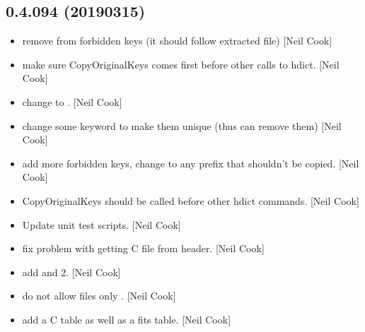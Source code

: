 \documentclass[a4paper,10pt,english]{report}
\begin{document}
\subsection{0.4.094 (2019\sphinxhyphen{}03\sphinxhyphen{}15)}
\label{\detokenize{misc/changelog:id184}}\begin{itemize}
\item {} 
 \sphinxhyphen{} remove  from forbidden keys (it should follow
extracted file) {[}Neil Cook{]}

\item {} 
 \sphinxhyphen{} make sure CopyOriginalKeys comes first before other
calls to hdict. {[}Neil Cook{]}

\item {} 
 \sphinxhyphen{} change  to .
{[}Neil Cook{]}

\item {} 
 \sphinxhyphen{} change some keyword to make them unique (thus can
remove them) {[}Neil Cook{]}

\item {} 
 \sphinxhyphen{} add more forbidden keys, change  to any prefix
that shouldn’t be copied. {[}Neil Cook{]}

\item {} 
 \sphinxhyphen{} CopyOriginalKeys should be called before other
hdict commands. {[}Neil Cook{]}

\item {} 
Update unit test scripts. {[}Neil Cook{]}

\item {} 
 \sphinxhyphen{} fix problem with getting C file from header. {[}Neil Cook{]}

\item {} 
 \sphinxhyphen{} add  and 2. {[}Neil Cook{]}

\item {} 
 \sphinxhyphen{} do not allow  files \sphinxhyphen{} only . {[}Neil
Cook{]}

\item {} 
 \sphinxhyphen{} add a C table as well as a fits table.
{[}Neil Cook{]}


\end{itemize}
\end{document}
